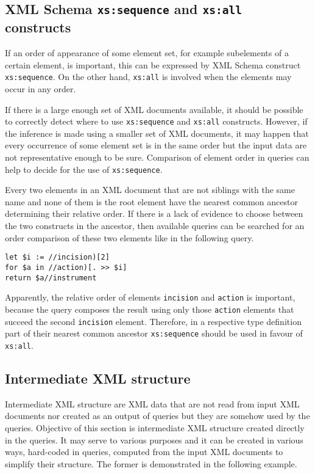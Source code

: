 \subsection{XML Schema \texttt{xs:sequence} and \texttt{xs:all} constructs}
If an order of appearance of some element set, for example subelements of a certain element, is important, this can be expressed by XML Schema construct \texttt{xs:sequence}. On the other hand, \texttt{xs:all} is involved when the elements may occur in any order.

If there is a large enough set of XML documents available, it should be possible to correctly detect where to use \texttt{xs:sequence} and \texttt{xs:all} constructs. However, if the inference is made using a smaller set of XML documents, it may happen that every occurrence of some element set is in the same order but the input data are not representative enough to be sure. Comparison of element order in queries can help to decide for the use of \texttt{xs:sequence}.

Every two elements in an XML document that are not siblings with the same name and none of them is the root element have the nearest common ancestor determining their relative order. If there is a lack of evidence to choose between the two constructs in the ancestor, then available queries can be searched for an order comparison of these two elements like in the following query.

\begin{verbatim}
let $i := //incision)[2]
for $a in //action)[. >> $i]
return $a//instrument
\end{verbatim}

Apparently, the relative order of elements \texttt{incision} and \texttt{action} is important, because the query composes the result using only those \texttt{action} elements that succeed the second \texttt{incision} element. Therefore, in a respective type definition part of their nearest common ancestor \texttt{xs:sequence} should be used in favour of \texttt{xs:all}.

\subsection{Intermediate XML structure}
Intermediate XML structure are XML data that are not read from input XML documents nor created as an output of queries but they are somehow used by the queries. Objective of this section is intermediate XML structure created directly in the queries. It may serve to various purposes and it can be created in various ways, hard-coded in queries, computed from the input XML documents to simplify their structure. The former is demonstrated in the following example.

